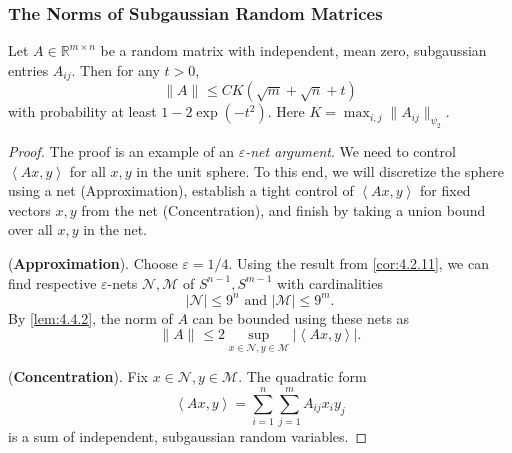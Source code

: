 \subsubsection{The Norms of Subgaussian Random Matrices}
\begin{theorem}[Name]
\label{thm:4.4.3}
Let $A \in \mathbb{R}^{m \times n}$ be a random matrix with independent, mean zero, subgaussian entries 
$A_{ij}$. Then for any $t > 0$, 
\[ \lVert A \rVert_{} \leq CK(\sqrt{m} + \sqrt{n} + t) \]
with probability at least $1 - 2\exp{(-t^2)}$. Here $K = \max_{i, j} \lVert A_{ij} \rVert_{\psi_2}$.
\end{theorem}

\begin{proof}
The proof is an example of an \textit{$\varepsilon$-net argument}. We need to control 
$\left\langle Ax, y \right\rangle$ for all $x, y$ in the unit sphere. To this end, we will discretize the sphere 
using a net (Approximation), establish a tight control of $\left\langle Ax, y \right\rangle$ for fixed vectors 
$x, y$ from the net (Concentration), and finish by taking a union bound over all $x, y$ in the net.

(\textbf{Approximation}). Choose $\varepsilon = 1/4$. Using the result from \cref{cor:4.2.11}, we can find 
respective $\varepsilon$-nets $\mathcal{N}, \mathcal{M}$ of $S^{n - 1}, S^{m - 1}$ with cardinalities 
\[ |\mathcal{N}| \leq 9^n \text{ and } |\mathcal{M}| \leq 9^m. \]
By \cref{lem:4.4.2}, the norm of $A$ can be bounded using these nets as 
\[ \lVert A \rVert_{} \leq 2 \sup_{x \in \mathcal{N}, y \in \mathcal{M}} |\left\langle Ax, y \right\rangle|. \]

(\textbf{Concentration}). Fix $x \in \mathcal{N}, y \in \mathcal{M}$. The quadratic form 
\[ \left\langle Ax, y \right\rangle = \sum_{i = 1}^{n} \sum_{j = 1}^{m} A_{ij}x_iy_j \]
is a sum of independent, subgaussian random variables. 
\end{proof}

